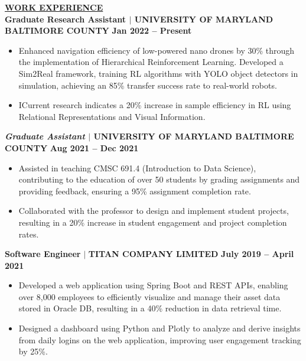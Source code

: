 \documentclass{article}
\begin{document}
\vspace{2mm}





\vspace{1mm}

\noindent \textbf{\underline{WORK EXPERIENCE}} \\
\noindent \textbf{Graduate Research Assistant $\mid$ UNIVERSITY OF MARYLAND BALTIMORE COUNTY } \hfill \textbf{Jan 2022 – Present }
\begin{itemize}[noitemsep,nolistsep,leftmargin=*]
    \item Enhanced navigation efficiency of low-powered nano drones by 30\% through the implementation of Hierarchical Reinforcement Learning. Developed a Sim2Real framework, training RL algorithms with YOLO object detectors in simulation, achieving an 85\% transfer success rate to real-world robots. 
    \item ICurrent research indicates a 20\% increase in sample efficiency in RL using Relational Representations and Visual Information.
\end{itemize}

\noindent \textbf{\textit{ Graduate Assistant }  $\mid$ UNIVERSITY OF MARYLAND BALTIMORE COUNTY }  \hfill \textbf{Aug 2021 – Dec 2021  }
\begin{itemize}[noitemsep,nolistsep,leftmargin=*]
    \item Assisted in teaching CMSC 691.4 (Introduction to Data Science), contributing to the education of over 50 students by grading assignments and providing feedback, ensuring a 95\% assignment completion rate.
    \item Collaborated with the professor to design and implement student projects, resulting in a 20\% increase in student engagement and project completion rates.
\end{itemize}

\vspace{1mm}

\noindent\textbf{Software Engineer } $\mid$ \textbf{TITAN COMPANY LIMITED } \hfill \textbf{July 2019 – April 2021 }
 \begin{itemize}[noitemsep,nolistsep,leftmargin=*]
\item Developed a web application using Spring Boot and REST APIs, enabling over 8,000 employees to efficiently visualize and manage their asset data stored in Oracle DB, resulting in a 40\% reduction in data retrieval time.
\item Designed a dashboard using Python and Plotly to analyze and derive insights from daily logins on the web application, improving user engagement tracking by 25\%.
 \end{itemize}
\end{document}
